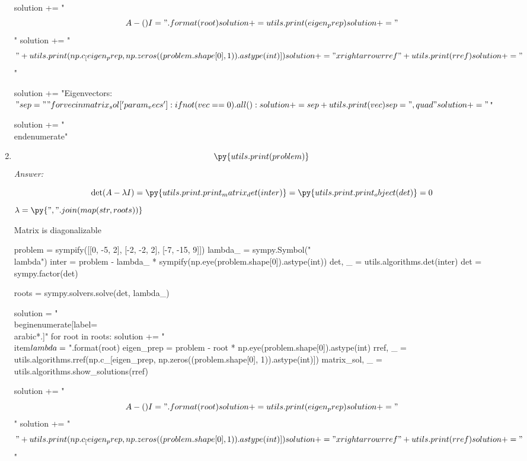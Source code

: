 \documentclass[letterpaper]{article}
\newcommand{\ans}{\textit{Answer: }}
\newenvironment{question}[2][Question]{\begin{trivlist}
\item[\hskip \labelsep {\bfseries #1}\hskip \labelsep {\bfseries #2.}]}{\end{trivlist}}
\newcommand{\printobj}[1]{\py{utils.print.print_object(#1)}}
\begin{document}
\begin{question}{5.5}
\begin{enumerate}[label=\textbf{(\alph*)}]
\begin{pycode}
  solution += "$$A - ({}) I = ".format(root)
  solution += utils.print(eigen_prep)
  solution += "$$\n"
  solution += "$$" + utils.print(np.c_[eigen_prep, np.zeros((problem.shape[0], 1)).astype(int)])
  solution += "\\xrightarrow{rref}" + utils.print(rref)
  solution += "$$\n"

  solution += "Eigenvectors: $"

  sep = ""
  for vec in matrix_sol['param_vecs']:
    if not (vec == 0).all():
      solution += sep + utils.print(vec)
      sep = ",\\quad"

  solution += "$\n"

solution += "\\end{enumerate}"

    \end{pycode}

    \item $$\py{utils.print(problem)}$$
    \ans

    $$\det(A - \lambda I) = \py{utils.print.print_matrix_det(inter)} = \printobj{det} = 0$$
    $\lambda = \py{", ".join(map(str, roots))}$


    Matrix is diagonalizable
    \begin{pycode}
problem = sympify([[0, -5, 2], [-2, -2, 2], [-7, -15, 9]])
lambda_ = sympy.Symbol("\\lambda")
inter = problem - lambda_ * sympify(np.eye(problem.shape[0]).astype(int))
det, _ = utils.algorithms.det(inter)
det = sympy.factor(det)

roots = sympy.solvers.solve(det, lambda_)

solution = "\\begin{enumerate}[label=\\arabic*.]\n"
for root in roots:
  solution += "\\item$\\lambda = {}$\n".format(root)
  eigen_prep = problem - root * np.eye(problem.shape[0]).astype(int)
  rref, _ = utils.algorithms.rref(np.c_[eigen_prep, np.zeros((problem.shape[0], 1)).astype(int)])
  matrix_sol, _ = utils.algorithms.show_solutions(rref)

  solution += "$$A - ({}) I = ".format(root)
  solution += utils.print(eigen_prep)
  solution += "$$\n"
  solution += "$$" + utils.print(np.c_[eigen_prep, np.zeros((problem.shape[0], 1)).astype(int)])
  solution += "\\xrightarrow{rref}" + utils.print(rref)
  solution += "$$\n"


\end{pycode}
\end{enumerate}
\end{question}
\end{document}
